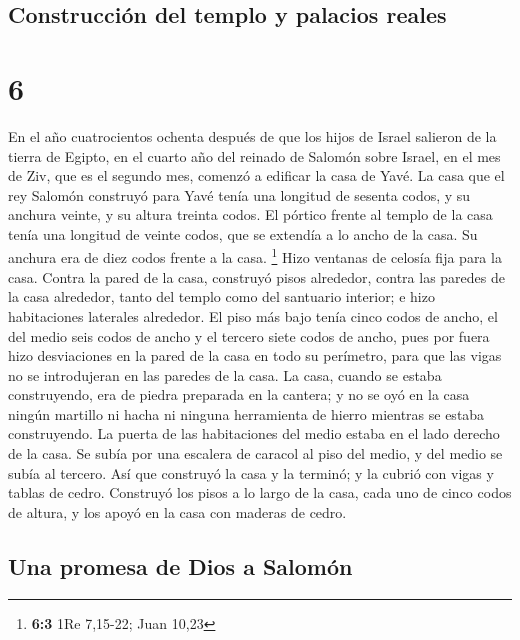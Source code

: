 \hypertarget{construcciuxf3n-del-templo-y-palacios-reales}{%
\subsection{Construcción del templo y palacios
reales}\label{construcciuxf3n-del-templo-y-palacios-reales}}

\hypertarget{section-5}{%
\section{6}\label{section-5}}

 En el año cuatrocientos ochenta después de que los hijos
de Israel salieron de la tierra de Egipto, en el cuarto año del reinado
de Salomón sobre Israel, en el mes de Ziv, que es el segundo mes,
comenzó a edificar la casa de Yavé.  La casa que el rey
Salomón construyó para Yavé tenía una longitud de sesenta codos, y su
anchura veinte, y su altura treinta codos.  El pórtico
frente al templo de la casa tenía una longitud de veinte codos, que se
extendía a lo ancho de la casa. Su anchura era de diez codos frente a la
casa. \footnote{\textbf{6:3} 1Re 7,15-22; Juan 10,23} 
Hizo ventanas de celosía fija para la casa.  Contra la
pared de la casa, construyó pisos alrededor, contra las paredes de la
casa alrededor, tanto del templo como del santuario interior; e hizo
habitaciones laterales alrededor.  El piso más bajo tenía
cinco codos de ancho, el del medio seis codos de ancho y el tercero
siete codos de ancho, pues por fuera hizo desviaciones en la pared de la
casa en todo su perímetro, para que las vigas no se introdujeran en las
paredes de la casa.  La casa, cuando se estaba
construyendo, era de piedra preparada en la cantera; y no se oyó en la
casa ningún martillo ni hacha ni ninguna herramienta de hierro mientras
se estaba construyendo.  La puerta de las habitaciones del
medio estaba en el lado derecho de la casa. Se subía por una escalera de
caracol al piso del medio, y del medio se subía al tercero.
 Así que construyó la casa y la terminó; y la cubrió con
vigas y tablas de cedro.  Construyó los pisos a lo largo
de la casa, cada uno de cinco codos de altura, y los apoyó en la casa
con maderas de cedro.

\hypertarget{una-promesa-de-dios-a-salomuxf3n}{%
\subsection{Una promesa de Dios a
Salomón}\label{una-promesa-de-dios-a-salomuxf3n}}

